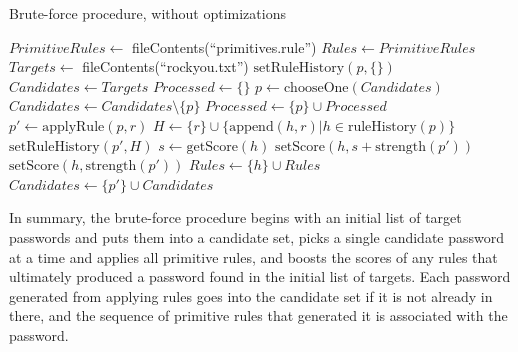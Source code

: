 \documentclass[letterpaper,twocolumn,10pt]{article}
\begin{document}
\begin{algorithm}\caption{Brute-force procedure, without optimizations}
\begin{algorithmic}[1]
\State $PrimitiveRules \gets $ fileContents(``primitives.rule'')
\State $Rules \gets PrimitiveRules$
\State $Targets \gets $ fileContents(``rockyou.txt'')
  \State $\mathrm{setRuleHistory}(p, \{\})$
\EndFor
\State $Candidates \gets Targets$
\State $Processed \gets \{\}$
  \State $p \gets \mathrm{chooseOne}(Candidates)$
  \State $Candidates \gets Candidates \setminus \{p\}$
  \State $Processed \gets \{p\} \cup Processed$
    \State $p' \gets \mathrm{applyRule}(p, r)$
    \State $H \gets \{r\}\cup\{\mathrm{append}(h, r)|h \in
\mathrm{ruleHistory}(p)\}$
    \State $\mathrm{setRuleHistory}(p', H)$
          \State $s \gets \mathrm{getScore}(h)$
          \State $\mathrm{setScore}(h,
s+\mathrm{strength}(p'))$
        \Else
          \State $\mathrm{setScore}(h, \mathrm{strength}(p'))$
          \State $Rules \gets \{h\}\cup Rules$
        \EndIf
      \EndFor
    \EndIf
      \State $Candidates \gets \{p'\}\cup Candidates$
    \EndIf
  \EndFor
\EndWhile
\end{algorithmic}
\label{alg:brute-force}
\end{algorithm}

In summary, the brute-force procedure begins with an initial list of target
passwords and puts them into a candidate set, picks a single candidate password
at a time and applies all primitive rules, and boosts the scores of any rules
that ultimately produced a password found in the initial list of targets. Each
password generated from applying rules goes into the candidate set if it is not
already in there, and the sequence of primitive rules that generated it is
associated with the password.
\end{document}
